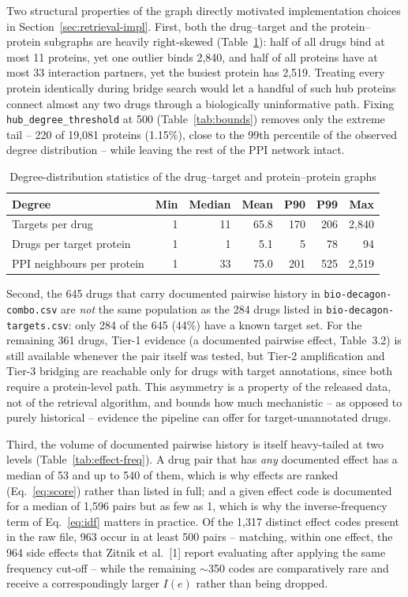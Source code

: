 \documentclass[11pt]{report}
\begin{document}
Two structural properties of the graph directly motivated implementation
choices in Section~\ref{sec:retrieval-impl}. First, both the drug--target
and the protein--protein subgraphs are heavily right-skewed
(Table~\ref{tab:degree}): half of all drugs bind at most 11 proteins, yet
one outlier binds 2{,}840, and half of all proteins have at most 33
interaction partners, yet the busiest protein has 2{,}519. Treating every
protein identically during bridge search would let a handful of such hub
proteins connect almost any two drugs through a biologically uninformative
path. Fixing \texttt{hub\_degree\_threshold} at 500 (Table~\ref{tab:bounds})
removes only the extreme tail -- 220 of 19{,}081 proteins (1.15\%), close to
the 99th percentile of the observed degree distribution -- while leaving the
rest of the PPI network intact.

\begin{table}[t]
  \caption{Degree-distribution statistics of the drug--target and protein--protein graphs}
  \label{tab:degree}
  \centering
  \begin{tabular}{@{}lrrrrrr@{}}
    \toprule
    Degree & Min & Median & Mean & P90 & P99 & Max \\
    \midrule
    Targets per drug            & 1 & 11 & 65.8 & 170 & 206 & 2{,}840 \\
    Drugs per target protein    & 1 & 1  & 5.1  & 5   & 78  & 94 \\
    PPI neighbours per protein  & 1 & 33 & 75.0 & 201 & 525 & 2{,}519 \\
    \bottomrule
  \end{tabular}
\end{table}

Second, the 645 drugs that carry documented pairwise history in
\texttt{bio-decagon-combo.csv} are \emph{not} the same population as the 284
drugs listed in \texttt{bio-decagon-targets.csv}: only 284 of the 645 (44\%)
have a known target set. For the remaining 361 drugs, Tier-1 evidence (a
documented pairwise effect, Table~3.2) is still available whenever the pair
itself was tested, but Tier-2 amplification and Tier-3 bridging are
reachable only for drugs with target annotations, since both require a
protein-level path. This asymmetry is a property of the released data, not
of the retrieval algorithm, and bounds how much mechanistic -- as opposed to
purely historical -- evidence the pipeline can offer for target-unannotated
drugs.

Third, the volume of documented pairwise history is itself heavy-tailed at
two levels (Table~\ref{tab:effect-freq}). A drug pair that has \emph{any}
documented effect has a median of 53 and up to 540 of them, which is why
effects are ranked (Eq.~\eqref{eq:score}) rather than listed in full; and a
given effect code is documented for a median of 1{,}596 pairs but as few as
1, which is why the inverse-frequency term of Eq.~\eqref{eq:idf} matters in
practice. Of the 1{,}317 distinct effect codes present in the raw file, 963
occur in at least 500 pairs -- matching, within one effect, the 964 side
effects that Zitnik et al.~[1] report evaluating after applying the same
frequency cut-off -- while the remaining $\sim$350 codes are comparatively
rare and receive a correspondingly larger $I(e)$ rather than being dropped.
\end{document}
